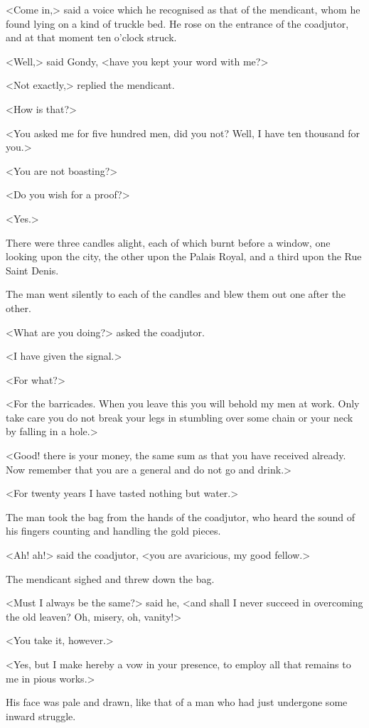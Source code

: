 <Come in,> said a voice which he recognised as that of the mendicant, whom he found lying on a kind of truckle bed. He rose on the entrance of the coadjutor, and at that moment ten o'clock struck.

<Well,> said Gondy, <have you kept your word with me?>

<Not exactly,> replied the mendicant.

<How is that?>

<You asked me for five hundred men, did you not? Well, I have ten thousand for you.>

<You are not boasting?>

<Do you wish for a proof?>

<Yes.>

There were three candles alight, each of which burnt before a window, one looking upon the city, the other upon the Palais Royal, and a third upon the Rue Saint Denis.

The man went silently to each of the candles and blew them out one after the other.

<What are you doing?> asked the coadjutor.

<I have given the signal.>

<For what?>

<For the barricades. When you leave this you will behold my men at work. Only take care you do not break your legs in stumbling over some chain or your neck by falling in a hole.>

<Good! there is your money, the same sum as that you have received already. Now remember that you are a general and do not go and drink.>

<For twenty years I have tasted nothing but water.>

The man took the bag from the hands of the coadjutor, who heard the sound of his fingers counting and handling the gold pieces.

<Ah! ah!> said the coadjutor, <you are avaricious, my good fellow.>

The mendicant sighed and threw down the bag.

<Must I always be the same?> said he, <and shall I never succeed in overcoming the old leaven? Oh, misery, oh, vanity!>

<You take it, however.>

<Yes, but I make hereby a vow in your presence, to employ all that remains to me in pious works.>

His face was pale and drawn, like that of a man who had just undergone some inward struggle.

